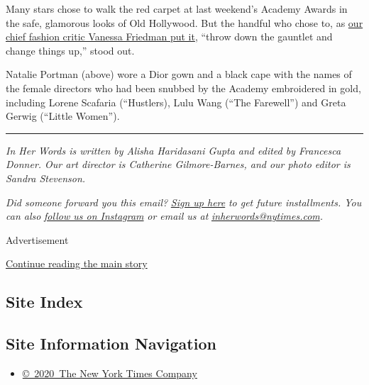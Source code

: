 Many stars chose to walk the red carpet at last weekend's Academy Awards
in the safe, glamorous looks of Old Hollywood. But the handful who chose
to, as
\href{https://www.nytimes.com/2020/02/10/style/oscars-red-carpet-fashion.html}{our
chief fashion critic Vanessa Friedman put it}, ``throw down the gauntlet
and change things up,'' stood out.

Natalie Portman (above) wore a Dior gown and a black cape with the names
of the female directors who had been snubbed by the Academy embroidered
in gold, including Lorene Scafaria (``Hustlers), Lulu Wang (``The
Farewell'') and Greta Gerwig (``Little Women'').

\begin{center}\rule{0.5\linewidth}{\linethickness}\end{center}

\emph{In Her Words is written by Alisha Haridasani Gupta and edited by
Francesca Donner. Our art director is Catherine Gilmore-Barnes, and our
photo editor is Sandra Stevenson.}

\emph{Did someone forward you this email?}
\href{https://www.nytimes.com/newsletters/in-her-words}{\emph{Sign up
here}} \emph{to get future installments. You can also}
\href{https://www.instagram.com/nytgender/}{\emph{follow us on
Instagram}} \emph{or email us at}
\href{mailto:inherwords@nytimes.com}{\emph{inherwords@nytimes.com}}\emph{.}

Advertisement

\protect\hyperlink{after-bottom}{Continue reading the main story}

\hypertarget{site-index}{%
\subsection{Site Index}\label{site-index}}

\hypertarget{site-information-navigation}{%
\subsection{Site Information
Navigation}\label{site-information-navigation}}

\begin{itemize}
\tightlist
\item
  \href{https://help.nytimes.com/hc/en-us/articles/115014792127-Copyright-notice}{©~2020~The
  New York Times Company}
\end{itemize}

